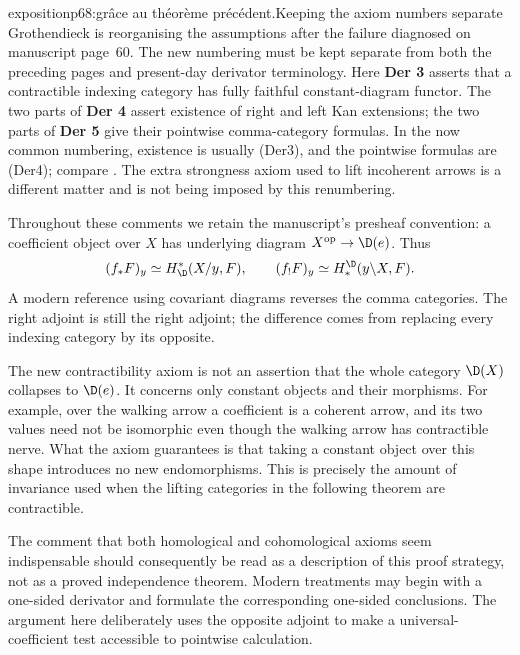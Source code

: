 \begin{dcomment}{exposition}{p68:grâce au théorème précédent.}{Keeping the axiom numbers separate}
Grothendieck is reorganising the assumptions after the failure diagnosed on manuscript page~60. The new numbering must be kept separate from both the preceding pages and present-day derivator terminology. Here \textbf{Der 3} asserts that a contractible indexing category has fully faithful constant-diagram functor. The two parts of \textbf{Der 4} assert existence of right and left Kan extensions; the two parts of \textbf{Der 5} give their pointwise comma-category formulas. In the now common numbering, existence is usually (Der3), and the pointwise formulas are (Der4); compare \citet[Definition~1.5]{Groth2013}. The extra strongness axiom used to lift incoherent arrows is a different matter and is not being imposed by this renumbering.

Throughout these comments we retain the manuscript's presheaf convention: a coefficient object over $X$ has underlying diagram $X^{\mathrm{op}}\to\D(e)$. Thus
\[
 (f_*F)_y\simeq H^*_{\D}(X/y,F),\qquad
 (f_!F)_y\simeq H^{\D}_*(y\backslash X,F).
\]
A modern reference using covariant diagrams reverses the comma categories. The right adjoint is still the right adjoint; the difference comes from replacing every indexing category by its opposite.

The new contractibility axiom is not an assertion that the whole category $\D(X)$ collapses to $\D(e)$. It concerns only constant objects and their morphisms. For example, over the walking arrow a coefficient is a coherent arrow, and its two values need not be isomorphic even though the walking arrow has contractible nerve. What the axiom guarantees is that taking a constant object over this shape introduces no new endomorphisms. This is precisely the amount of invariance used when the lifting categories in the following theorem are contractible.

The comment that both homological and cohomological axioms seem indispensable should consequently be read as a description of this proof strategy, not as a proved independence theorem. Modern treatments may begin with a one-sided derivator and formulate the corresponding one-sided conclusions. The argument here deliberately uses the opposite adjoint to make a universal-coefficient test accessible to pointwise calculation.
\end{dcomment}

